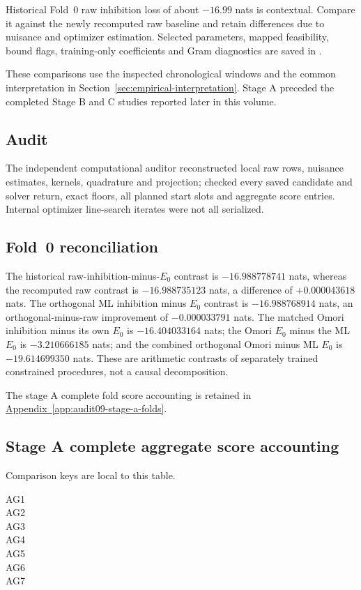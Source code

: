 Historical Fold~0 raw inhibition loss of about $-16.99$ nats is contextual. Compare it against the newly recomputed raw baseline and retain differences due to nuisance and optimizer estimation. Selected parameters, mapped feasibility, bound flags, training-only coefficients and Gram diagnostics are saved in .

These comparisons use the inspected chronological windows and the common interpretation in Section~\ref{sec:empirical-interpretation}. Stage A preceded the completed Stage B and C studies reported later in this volume.

\subsection{Audit}


The independent computational auditor reconstructed local raw rows, nuisance estimates, kernels, quadrature and projection; checked every saved candidate and solver return, exact floors, all planned start slots and aggregate score entries. Internal optimizer line-search iterates were not all serialized.

\subsection{Fold~0 reconciliation}


The historical raw-inhibition-minus-$E_0$ contrast is $-16.988778741$ nats, whereas the recomputed raw contrast is $-16.988735123$ nats, a difference of $+0.000043618$ nats.
The orthogonal ML inhibition minus $E_0$ contrast is $-16.988768914$ nats, an orthogonal-minus-raw improvement of $-0.000033791$ nats.
The matched Omori inhibition minus its own $E_0$ is $-16.404033164$ nats; the Omori $E_0$ minus the ML $E_0$ is $-3.210666185$ nats; and the combined orthogonal Omori minus ML $E_0$ is $-19.614699350$ nats.
These are arithmetic contrasts of separately trained constrained procedures, not a causal decomposition.




\noindent The stage A complete fold score accounting is retained in \hyperref[app:audit09-stage-a-folds]{Appendix~\ref{app:audit09-stage-a-folds}}.

\subsection{Stage A complete aggregate score accounting}
Comparison keys are local to this table. 
\begin{description}
\item[AG1] 
\item[AG2] 
\item[AG3] 
\item[AG4] 
\item[AG5] 
\item[AG6] 
\item[AG7] 
\end{description}

